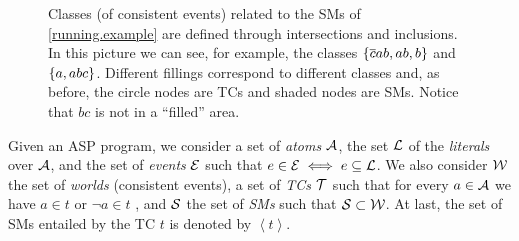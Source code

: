 \documentclass[adraft,copyright,creativecommons]{eptcs}
\newcommand{\co}[1]{\ensuremath{\overline{#1}}}
\newcommand{\fml}[1]{\ensuremath{{\cal #1}}}
\newcommand{\tcgen}[1]{\ensuremath{\left<#1\right>}}
\newcounter{remark}
\newcommand{\note}[1]{
    \stepcounter{remark}%
    {\!\!\color{red}/}\footnotemark[\arabic{remark}]\!\!%
    \footnotetext[\arabic{remark}]{{\color{red}/}#1}
}
\begin{document}
\begin{figure*}[t]
\begin{center}
    \end{center}

    \caption{Classes (of consistent events) related to the \aclp{SM} of \cref{running.example} are defined through intersections and inclusions. In this picture we can see, for example, the classes $\set{\co{c}ab, ab, b}$ and $\set{a, abc}$. Different fillings correspond to different classes and, as before, the circle nodes are \aclp{TC} and shaded nodes are \aclp{SM}. Notice that $bc$ is not in a ``filled'' area.}
    \label{fig:running.example.classes}
\end{figure*}    

Given an ASP program, we consider a set of \emph{atoms} $ \fml{A}$, the set $\fml{L}$ of the \emph{literals} over \fml{A}, and the set of \emph{events} $\fml{E}$ such that $e \in \fml{E} \iff e \subseteq \fml{L}$. We also consider $\fml{W}$ the set of \emph{worlds} (consistent events), 
a set of \emph{\aclp{TC}} $\fml{T}$ such that for every $a \in \fml{A}$ we have $a \in t$ or $\neg a \in t$
, and $\fml{S}$ the set of \emph{\aclp{SM}} such that $ \fml{S}\subset\fml{W}$. At last, the set of \aclp{SM} entailed by the \acl{TC} $t$ is denoted by $\tcgen{t}$.
\end{document}
